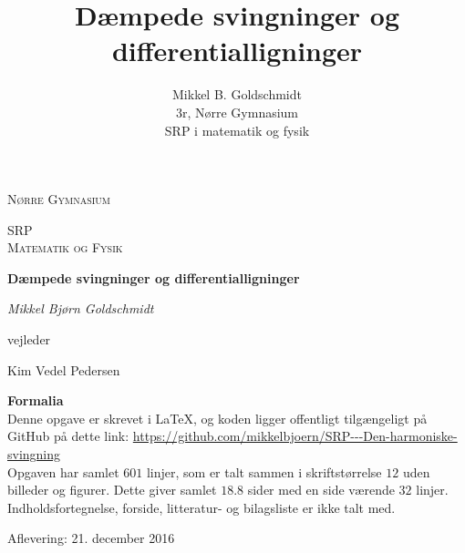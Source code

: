\documentclass[11pt,a4paper,openany,oneside]{book}
\author{Mikkel B. Goldschmidt \\ 3r, Nørre Gymnasium \\ SRP i matematik og fysik}
\title{Dæmpede svingninger og differentialligninger}
\begin{document}


\begin{titlepage}
	\centering
	
	{\scshape\LARGE Nørre Gymnasium\par}
	\vspace{1cm}
	{\scshape\Large SRP \\ \large Matematik og Fysik\par}
	\vspace{1.5cm}
	{\huge\bfseries Dæmpede svingninger og differentialligninger\par}
	\vspace{2cm}
	{\Large\itshape Mikkel Bjørn Goldschmidt\par }
	
	
	\vfill
	vejleder\par
	Kim Vedel Pedersen
	\vfill

	\begin{framed}
	\textbf{Formalia}\\
	Denne opgave er skrevet i \LaTeX,  og koden ligger offentligt tilgængeligt på GitHub på dette link: \url{https://github.com/mikkelbjoern/SRP---Den-harmoniske-svingning}\\
	
	Opgaven har samlet $601$ linjer, som er talt sammen i skriftstørrelse $12$ uden billeder og figurer. 
	Dette giver samlet $18.8$ sider med en side værende $32$ linjer. 
	Indholdsfortegnelse, forside, litteratur- og bilagsliste er ikke talt med.
	\end{framed}

	\vfill
	{\large Aflevering: 21. december 2016\par}
\end{titlepage}


\begin{singlespacing}
\tableofcontents
\end{singlespacing}
\pagebreak


























\end{document}
